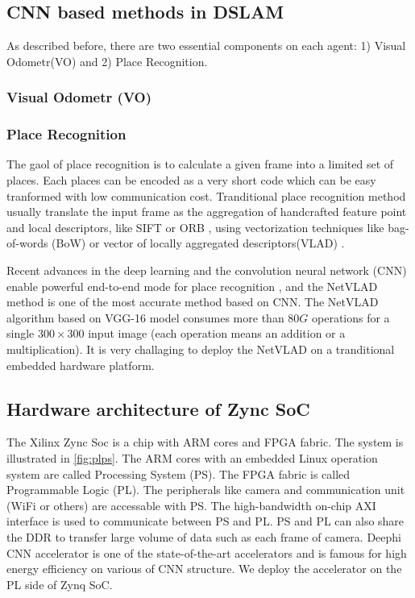 \label{sec:background}
\subsection{CNN based methods in DSLAM}
As described before, there are two essential components on each agent: 1) Visual Odometr(VO) and 2) Place Recognition.

\subsubsection{Visual Odometr (VO)}

\subsubsection{Place Recognition}

The gaol of place recognition is to calculate a given frame into a limited set of places. Each  places can be encoded as a very short code which can be easy tranformed with low communication cost. Tranditional place recognition method usually translate the input frame as the aggregation of handcrafted feature point and local descriptors, like SIFT \cite{Lowe:2004e6e} or ORB \cite{Mur-Artal:2017281}, using vectorization techniques like bag-of-words (BoW) \cite{Galvez-Lopez:2012c94} or vector of locally aggregated descriptors(VLAD) \cite{Jegou:2010f45}.

Recent advances in the deep learning and the convolution neural network (CNN) enable powerful end-to-end mode for place recognition \cite{Noh:2017d0b,Arandjelovic:2017997}, and the NetVLAD method is one of the most accurate method based on CNN. The NetVLAD algorithm based on VGG-16 model \cite{Simonyan:20143be} consumes more than $80G$ operations for a single $300 \times 300$ input image (each operation means an addition or a multiplication). It is very challaging to deploy the NetVLAD on a tranditional embedded hardware platform.

\subsection{Hardware architecture of Zync SoC}
The Xilinx Zync Soc is a chip with ARM cores and FPGA fabric. The system is illustrated in \cref{fig:plps}. The ARM cores with an embedded Linux operation system are called Processing System (PS). The FPGA fabric is called Programmable Logic (PL). The peripherals like camera and communication unit (WiFi or others) are accessable with PS. The high-bandwidth on-chip AXI interface is used to communicate between PS and PL. PS and PL can also share the DDR to transfer large volume of data such as each frame of camera.
Deephi CNN accelerator \cite{Tech:2019360} is one of the state-of-the-art accelerators and is famous for high energy efficiency on various of CNN structure. We deploy the accelerator on the PL side of Zynq SoC.

